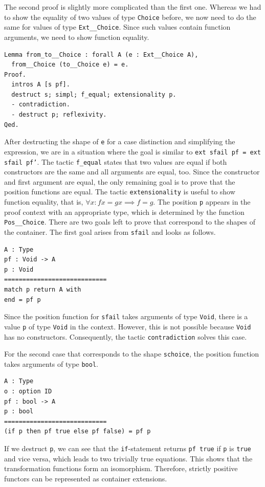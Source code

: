 \documentclass[a4paper, 11pt, fleqn, twoside]{scrreprt}
\newcommand{\hinl}[1]{\texttt{#1}}
\newcommand{\cinl}[1]{\texttt{#1}}
\begin{document}
The second proof is slightly more complicated than the first one.
Whereas we had to show the equality of two values of type \cinl{Choice} before, we now need to do the same for values of type \cinl{Ext__Choice}.
Since such values contain function arguments, we need to show function equality.

\begin{verbatim}
Lemma from_to__Choice : forall A (e : Ext__Choice A),
  from__Choice (to__Choice e) = e.
Proof.
  intros A [s pf].
  destruct s; simpl; f_equal; extensionality p.
  - contradiction.
  - destruct p; reflexivity.
Qed. 
\end{verbatim}

After destructing the shape of \cinl{e} for a case distinction and simplifying the expression, we are in a situation where the goal is similar to \cinl{ext sfail pf = ext sfail pf'}.
The tactic \cinl{f_equal} states that two values are equal if both constructors are the same and all arguments are equal, too.
Since the constructor and first argument are equal, the only remaining goal is to prove that the position functions are equal.
The tactic \cinl{extensionality} is useful to show function equality, that is, $\forall x: f x = g x \implies f = g$.
The position \cinl{p} appears in the proof context with an appropriate type, which is determined by the function \cinl{Pos__Choice}.
There are two goals left to prove that correspond to the shapes of the container.
The first goal arises from \cinl{sfail} and looks as follows.

\begin{verbatim}
A : Type
pf : Void -> A
p : Void
============================
match p return A with
end = pf p
\end{verbatim}

Since the position function for \cinl{sfail} takes arguments of type \cinl{Void}, there is a value \cinl{p} of type \cinl{Void} in the context.
However, this is not possible because \cinl{Void} has no constructors.
Consequently, the tactic \cinl{contradiction} solves this case.

For the second case that corresponds to the shape \cinl{schoice}, the position function takes arguments of type \cinl{bool}.

\begin{verbatim}
A : Type
o : option ID
pf : bool -> A
p : bool
============================
(if p then pf true else pf false) = pf p
\end{verbatim}

If we destruct \hinl{p}, we can see that the \cinl{if}-statement returns \cinl{pf true} if \cinl{p} is \cinl{true} and vice versa, which leads to two trivially true equations.
This shows that the transformation functions form an isomorphism.
Therefore, strictly positive functors can be represented as container extensions.
\end{document}
